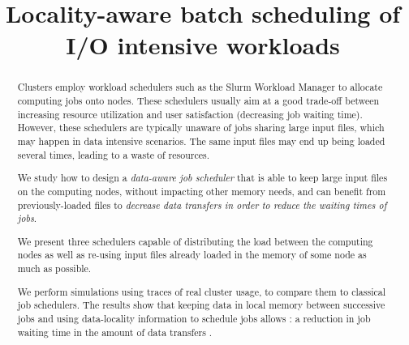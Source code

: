 \documentclass[sigconf,review,anonymous]{acmart}
\newcommand{\rev}[1]{{\color{blue}{#1}}}
\begin{document}
\title{Locality-aware batch scheduling of I/O intensive workloads}

\begin{abstract}
  Clusters employ workload schedulers such as
  the Slurm Workload Manager to allocate computing jobs onto
  nodes. These schedulers usually aim at a good trade-off between
  increasing resource utilization and user satisfaction (decreasing
  job waiting time). However, these schedulers are typically unaware
  of jobs sharing large input files, which may happen in data
  intensive scenarios. The same input files may end up being loaded several
  times, leading to a waste of resources.
   
  We study how to design a \textit{data-aware job scheduler} that is
  able to keep large input files on the computing nodes, without
  impacting other memory needs, and can benefit from previously-loaded files to
  \textit{decrease data transfers in order to reduce the waiting times of jobs}.

  We present three schedulers capable of distributing the load between
  the computing nodes as well as re-using input files already loaded
  in the memory of some node as much as possible.
  
  We perform simulations using traces of real cluster usage, to compare
  them to classical job schedulers. The results show that
  keeping data in local memory between successive jobs and using data-locality
  information to schedule jobs allows \rev{improves performance compared
  to a widely used scheduler (FCFS)}: a reduction in job waiting time
  \rev{(a 7.5\% improvement in stretch), and a decrease} in the
  amount of data transfers \rev{(7\%)}.



\end{abstract}
\end{document}
